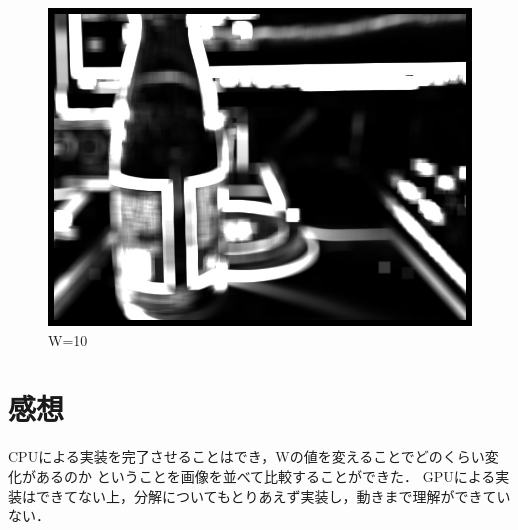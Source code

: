 \documentclass[11pt]{jarticle}
\begin{document}
\begin{figure}[t]
    \centering
    \includegraphics[scale=.5]{w10.jpg}
    \caption{W=10}
    \label{saigo}
\end{figure}

\section{感想}

CPUによる実装を完了させることはでき，Wの値を変えることでどのくらい変化があるのか
ということを画像を並べて比較することができた．
GPUによる実装はできてない上，分解についてもとりあえず実装し，動きまで理解ができていない．
\end{document}
